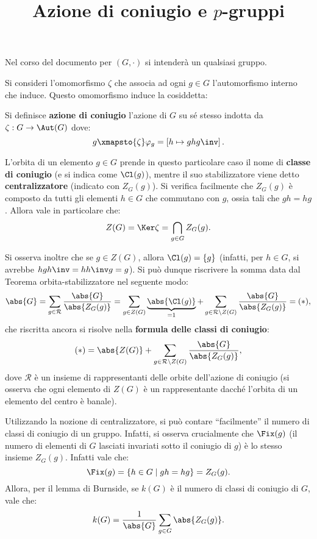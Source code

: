 \documentclass[12pt]{scrartcl}
\begin{document}
	\title{Azione di coniugio e $p$-gruppi}
	\maketitle
	
	\begin{note}
		Nel corso del documento per $(G, \cdot)$ si intenderà un qualsiasi gruppo.
	\end{note}
	
	Si consideri l'omomorfismo $\zeta$ che associa ad ogni $g \in G$ l'automorfismo interno
	che induce. Questo omomorfismo induce la cosiddetta:
	
	\begin{definition}
		Si definisce \textbf{azione di coniugio} l'azione di $G$ su sé stesso indotta da $\zeta : G \to \Aut(G)$ dove:
		\[ g \xmapsto{\zeta} \varphi_g = \left[ h \mapsto g h g\inv \right]. \]
	\end{definition}
	
	L'orbita di un elemento $g \in G$ prende in questo particolare caso il nome
	di \textbf{classe di coniugio} (e si indica come $\Cl(g)$), mentre il suo stabilizzatore viene detto \textbf{centralizzatore} (indicato con $Z_G(g)$). Si verifica facilmente
	che $Z_G(g)$ è composto da tutti gli elementi $h \in G$ che commutano con $g$, ossia
	tali che $gh = hg$. Allora vale in particolare che:
	\[ Z(G) = \Ker \zeta = \bigcap_{g \in G} Z_G(g). \] \medskip
	
	
	Si osserva inoltre che se $g \in Z(G)$, allora $\Cl(g) = \{g\}$ (infatti, per $h \in G$, si avrebbe $h g h\inv = h h\inv g = g$). Si può dunque riscrivere la somma data dal
	Teorema orbita-stabilizzatore nel seguente modo:
	\[ \abs{G} = \sum_{g \in \mathcal{R}} \frac{\abs{G}}{\abs{Z_G(g)}} = \sum_{g \in Z(G)} \underbrace{\abs{\Cl(g)}}_{=1} + \sum_{g \in \mathcal{R} \setminus Z(G)} \frac{\abs{G}}{\abs{Z_G(g)}} = (*), \]
	che riscritta ancora si risolve nella \textbf{formula delle classi di coniugio}:
	\[ (*) = \abs{Z(G)} + \sum_{g \in \mathcal{R} \setminus Z(G)} \frac{\abs{G}}{\abs{Z_G(g)}}, \]
	dove $\mathcal{R}$ è un insieme di rappresentanti delle orbite dell'azione di coniugio
	(si osserva che ogni elemento di $Z(G)$ è un rappresentante dacché l'orbita di un
	elemento del centro è banale). \medskip
	
	
	Utilizzando la nozione di centralizzatore, si può contare ``facilmente'' il numero
	di classi di coniugio di un gruppo. Infatti, si osserva crucialmente che
	$\Fix(g)$ (il numero di elementi di $G$ lasciati invariati sotto il coniugio di $g$)
	è lo stesso insieme $Z_G(g)$. Infatti vale che:
	\[ \Fix(g) = \{ h \in G \mid gh = hg \} = Z_G(g). \]
	Allora, per il lemma di Burnside, se $k(G)$ è il numero di classi di coniugio di $G$, vale che:
	\[ k(G) = \frac{1}{\abs{G}} \sum_{g \in G} \abs{Z_G(g)}. \] \bigskip
	
\end{document}
